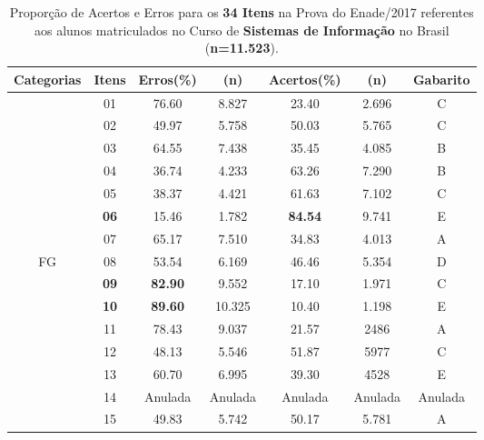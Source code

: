 \documentclass[12pt]{article}
\begin{document}
\begin{table}[htbp]
	\centering
	\caption{Proporção de Acertos e Erros para os \textbf{34 Itens} na Prova do Enade/2017 referentes aos alunos matriculados no Curso de \textbf{Sistemas de Informação} no Brasil (\textbf{n=11.523}).}
\begin{tabular}{c|c|c|c|c|c|c}
\hline\hline 
 Categorias    &  Itens      & Erros(\%)           & (n)      & Acertos(\%)       & (n)      & Gabarito  \\
\hline\hline
               & 01          &  76.60              &  8.827   & 23.40             &  2.696   &  C       \\
               & 02          &  49.97              &  5.758   &  50.03            & 5.765    &  C       \\
               & 03          &  64.55              &  7.438   &  35.45            & 4.085    &  B       \\
               & 04          &  36.74              &  4.233   &  63.26            & 7.290    &  B       \\
               & 05          &  38.37              &  4.421   &  61.63            & 7.102    &  C       \\
               & \textbf{06} &  15.46              &  1.782   & \textbf{84.54}    & 9.741    &  E       \\
               & 07          &  65.17              &  7.510   & 34.83             & 4.013    &  A       \\
FG             & 08          &  53.54              &  6.169   & 46.46             & 5.354    &  D       \\
\hline
               & \textbf{09} & \textbf{82.90}      &  9.552    & 17.10            & 1.971    &  C      \\
               & \textbf{10} &  \textbf{89.60}     &  10.325   & 10.40            &  1.198   &  E      \\
               & 11          &  78.43              &  9.037    & 21.57            & 2486     &  A      \\
               & 12          &  48.13              &  5.546    & 51.87            & 5977     &  C      \\
               & 13          &  60.70              &  6.995    & 39.30            & 4528     &  E      \\
               & 14          &  Anulada            &  Anulada  &  Anulada         & Anulada  &  Anulada  \\
               & 15          & 49.83               &  5.742    & 50.17            & 5.781    &  A     \\

\end{tabular}
\end{table}
\end{document}
